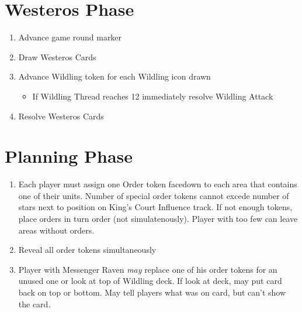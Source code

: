 \documentclass[12pt]{article}
\newenvironment{enumerateCustom}
{\begin{enumerate}
  \setlength{\itemsep}{1pt}
  \setlength{\parskip}{0pt}
  \setlength{\parsep}{0pt}}
{\end{enumerate}}
\newenvironment{itemizeCustom}
{\begin{itemize}
  \setlength{\itemsep}{1pt}
  \setlength{\parskip}{0pt}
  \setlength{\parsep}{0pt}}
{\end{itemize}}
\begin{document}
\begin{multicols*}{2}
\section*{Westeros Phase}
\begin{enumerateCustom}
	\item Advance game round marker
	\item Draw Westeros Cards
	\item Advance Wildling token for each Wildling icon drawn 
	\begin{itemizeCustom}
		\item If Wildling Thread reaches 12 immediately resolve Wildling Attack
	\end{itemizeCustom}
	\item Resolve Westeros Cards
\end{enumerateCustom}

\section*{Planning Phase}
\begin{enumerateCustom}
	\item Each player must assign one Order token facedown to each area that contains one of their units. Number of special order tokens cannot excede number of stars next to position on King's Court Influence track. If not enough tokens, place orders in turn order (not simulatenously). Player with too few can leave areas without orders.
	\item Reveal all order tokens simultaneously
	\item Player with Messenger Raven \emph{may} replace one of his order tokens for an unused one or look at top of Wildling deck. If look at deck, may put card back on top or bottom. May tell players what was on card, but can't show the card.
\end{enumerateCustom}


\end{multicols*}
\end{document}
